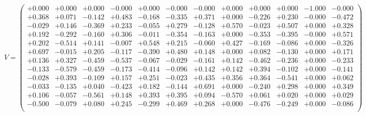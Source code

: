 \documentclass[9pt]{article}
\theoremstyle{plain}
\theoremstyle{definition}
\theoremstyle{remark}
\numberwithin{equation}{section}
\begin{document}
$V = \left(
\begin{array}{
cccccccccccc}
+0.000 & +0.000 & +0.000 & -0.000 & +0.000 & -0.000 & -0.000 & +0.000 & +0.000 & +0.000 & -1.000 & -0.000 \\
+0.368 & +0.071 & -0.142 & +0.483 & -0.168 & -0.335 & +0.371 & +0.000 & -0.226 & +0.230 & -0.000 & -0.472 \\
-0.029 & +0.146 & -0.369 & +0.233 & -0.055 & +0.279 & -0.128 & +0.570 & -0.023 & +0.507 & +0.000 & +0.328 \\
+0.192 & -0.292 & -0.160 & +0.306 & -0.011 & -0.354 & -0.163 & +0.000 & -0.353 & -0.395 & -0.000 & +0.571 \\
+0.202 & -0.514 & +0.141 & -0.007 & +0.548 & +0.215 & -0.060 & +0.427 & -0.169 & -0.086 & +0.000 & -0.326 \\
+0.697 & -0.015 & +0.205 & -0.117 & -0.390 & +0.480 & +0.148 & +0.000 & +0.082 & -0.130 & +0.000 & +0.171 \\
+0.136 & +0.327 & -0.459 & -0.537 & -0.067 & -0.029 & -0.161 & +0.142 & -0.462 & -0.236 & +0.000 & -0.233 \\
-0.133 & -0.579 & -0.459 & -0.173 & -0.414 & -0.096 & +0.142 & +0.142 & +0.394 & -0.102 & +0.000 & -0.141 \\
-0.028 & +0.393 & -0.109 & +0.157 & +0.251 & -0.023 & +0.435 & +0.356 & +0.364 & -0.541 & +0.000 & +0.062 \\
-0.033 & -0.135 & +0.040 & -0.423 & +0.182 & -0.144 & +0.691 & +0.000 & -0.240 & +0.298 & +0.000 & +0.349 \\
+0.106 & -0.057 & -0.561 & +0.148 & +0.393 & +0.395 & +0.094 & -0.570 & +0.061 & +0.020 & +0.000 & +0.029 \\
-0.500 & -0.079 & +0.080 & +0.245 & -0.299 & +0.469 & +0.268 & +0.000 & -0.476 & -0.249 & +0.000 & -0.086 \\
\end{array}
\right)$ \newline 
\end{document}
